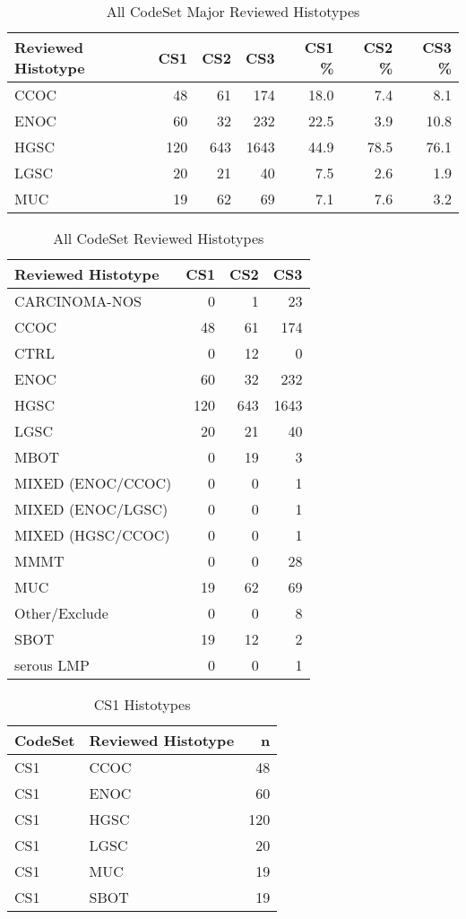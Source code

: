\documentclass[
]{report}
\begin{document}
\begin{table}

\caption{\label{tab:dist-major-hist}All CodeSet Major Reviewed Histotypes}
\centering
\begin{tabular}[t]{l|r|r|r|r|r|r}
\hline
Reviewed Histotype & CS1 & CS2 & CS3 & CS1 \% & CS2 \% & CS3 \%\\
\hline
CCOC & 48 & 61 & 174 & 18.0 & 7.4 & 8.1\\
\hline
ENOC & 60 & 32 & 232 & 22.5 & 3.9 & 10.8\\
\hline
HGSC & 120 & 643 & 1643 & 44.9 & 78.5 & 76.1\\
\hline
LGSC & 20 & 21 & 40 & 7.5 & 2.6 & 1.9\\
\hline
MUC & 19 & 62 & 69 & 7.1 & 7.6 & 3.2\\
\hline
\end{tabular}
\end{table}

\begin{table}

\caption{\label{tab:dist-all}All CodeSet Reviewed Histotypes}
\centering
\begin{tabular}[t]{l|r|r|r}
\hline
Reviewed Histotype & CS1 & CS2 & CS3\\
\hline
CARCINOMA-NOS & 0 & 1 & 23\\
\hline
CCOC & 48 & 61 & 174\\
\hline
CTRL & 0 & 12 & 0\\
\hline
ENOC & 60 & 32 & 232\\
\hline
HGSC & 120 & 643 & 1643\\
\hline
LGSC & 20 & 21 & 40\\
\hline
MBOT & 0 & 19 & 3\\
\hline
MIXED (ENOC/CCOC) & 0 & 0 & 1\\
\hline
MIXED (ENOC/LGSC) & 0 & 0 & 1\\
\hline
MIXED (HGSC/CCOC) & 0 & 0 & 1\\
\hline
MMMT & 0 & 0 & 28\\
\hline
MUC & 19 & 62 & 69\\
\hline
Other/Exclude & 0 & 0 & 8\\
\hline
SBOT & 19 & 12 & 2\\
\hline
serous LMP & 0 & 0 & 1\\
\hline
\end{tabular}
\end{table}

\begin{table}

\caption{\label{tab:dist-cs1}CS1 Histotypes}
\centering
\begin{tabular}[t]{l|l|r}
\hline
CodeSet & Reviewed Histotype & n\\
\hline
CS1 & CCOC & 48\\
\hline
CS1 & ENOC & 60\\
\hline
CS1 & HGSC & 120\\
\hline
CS1 & LGSC & 20\\
\hline
CS1 & MUC & 19\\
\hline
CS1 & SBOT & 19\\
\hline
\end{tabular}
\end{table}
\end{document}
